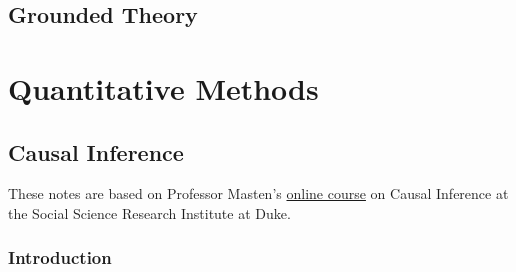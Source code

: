 \documentclass[]{book}
\begin{document}
\hypertarget{grounded-theory}{%
\section{Grounded Theory}\label{grounded-theory}}

\hypertarget{quantitative-methods}{%
\chapter{Quantitative Methods}\label{quantitative-methods}}

\hypertarget{causal-inference}{%
\section*{Causal Inference}\label{causal-inference}}

These notes are based on Professor Masten's \href{https://modu.ssri.duke.edu/topic/introduction-causal-inference}{online course} on Causal Inference at the Social Science Research Institute at Duke.

\hypertarget{introduction}{%
\subsection{Introduction}\label{introduction}}
\end{document}
